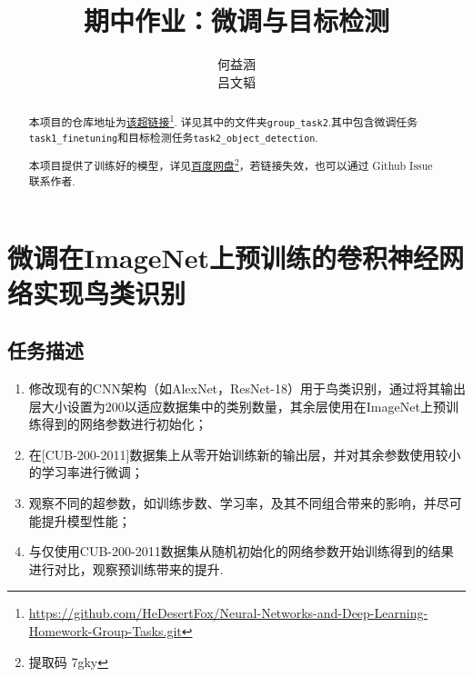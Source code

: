 \documentclass[notitlepage,cs4size,punct,oneside]{ctexrep}
\title{{\zihao{1}\bfseries 期中作业：微调与目标检测}}
\author{何益涵 \quad 20307110032\\吕文韬 \quad 23210180109}
\date{}
\numberwithin{equation}{chapter}
\theoremstyle{mystyle}
\begin{document}
\CTEXoptions[abstractname={摘要: }]
\CTEXoptions[bibname={\bfseries 参考文献}]

\renewcommand{\thepage}{\roman{page}}
\setcounter{page}{1}

\maketitle\renewcommand{\thepage}{\arabic{page}}
\thispagestyle{empty}\setcounter{page}{0}
\renewcommand{\abstractname}{摘要: }
\begin{abstract}
     本项目的仓库地址为\href{https://github.com/HeDesertFox/Neural-Networks-and-Deep-Learning-Homework-Group-Tasks.git}{该超链接}\footnote{\href{https://github.com/HeDesertFox/Neural-Networks-and-Deep-Learning-Homework-Group-Tasks.git}{https://github.com/HeDesertFox/Neural-Networks-and-Deep-Learning-Homework-Group-Tasks.git}}. 详见其中的文件夹\texttt{group\_task2}.其中包含微调任务\texttt{task1\_finetuning}和目标检测任务\texttt{task2\_object\_detection}.

     本项目提供了训练好的模型，详见\href{https://pan.baidu.com/s/13tcZIUmMMGd9pm_A8NpbZQ?pwd=7gky}{百度网盘}\footnote{提取码 7gky}，若链接失效，也可以通过 Github Issue 联系作者.


\end{abstract}



\chapter{微调在ImageNet上预训练的卷积神经网络实现鸟类识别}
\section{任务描述}
\begin{enumerate}
\item 修改现有的CNN架构（如AlexNet，ResNet-18）用于鸟类识别，通过将其输出层大小设置为200以适应数据集中的类别数量，其余层使用在ImageNet上预训练得到的网络参数进行初始化；
\item 在[CUB-200-2011]数据集上从零开始训练新的输出层，并对其余参数使用较小的学习率进行微调；
\item 观察不同的超参数，如训练步数、学习率，及其不同组合带来的影响，并尽可能提升模型性能；
\item 与仅使用CUB-200-2011数据集从随机初始化的网络参数开始训练得到的结果进行对比，观察预训练带来的提升.
\end{enumerate}
\end{document}
